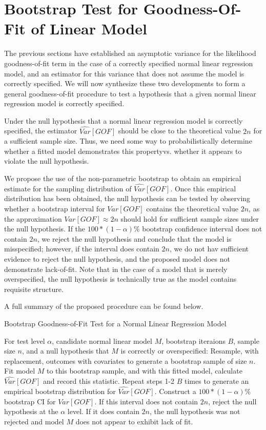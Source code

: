 		\section{Bootstrap Test for Goodness-Of-Fit of Linear Model} \label{sec:boot_test}

		The previous sections have established an asymptotic variance for the likelihood goodness-of-fit term in the case of a correctly specified normal linear regression model, and an
		estimator for this variance that does not assume the model is correctly specified. We will now synthesize these two developments to form a general goodness-of-fit procedure to
		test a hypothesis that a given normal linear regression model is correctly specified.

		Under the null hypothesis that a normal linear regression model is correctly specified, the estimator $\widehat{Var}[GOF]$ should be close to the theoretical value $2n$ for a
		sufficient sample size. Thus, we need some way to probabilistically determine whether a fitted model demonstrates this propertyvs. whether it appears to violate the null
		hypothesis.
		
		We propose the use of the non-parametric bootstrap to obtain an empirical estimate for the sampling distribution of $\widehat{Var}[GOF]$. Once this empirical distribution
		has been obtained, the null hypothesis can be tested by observing whether a bootstrap interval for $Var[GOF]$ contains the theoretical value $2n$, as the approximation
		$Var[GOF] \approx 2n$ should hold for sufficient sample sizes under the null hypothesis. If the $100*(1-\alpha)$\% bootstrap confidence interval does not contain 
		$2n$, we reject the null hypothesis and conclude that the model is misspecified; however, if the interval does contain $2n$, we do not hav sufficient evidence to reject
		the null hypothesis, and the proposed model does not demonstrate lack-of-fit. Note that in the case of a model that is merely overspecified, the null hypothesis is technically
		true as the model contains requisite structure.

		A full summary of the proposed procedure can be found below.
		\begin{algorithm}
			\caption{Bootstrap Goodness-of-Fit Test for a Normal Linear Regression Model}
			\begin{algorithmic}[1]
			  \Statex For test level $\alpha$, candidate normal linear model $M$, bootstrap iteraions $B$, sample size $n$, and a null hypothesis that $M$
			  is correctly or overspecified:
			  \State Resample, with replacement, outcomes with covariates to generate a bootstrap sample of size $n$.
			  \State Fit model $M$ to this bootstrap sample, and with this fitted model, calculate $\widehat{Var}[GOF]$
			  and record this statistic.
			  \State Repeat steps 1-2 $B$ times to generate an empirical bootstrap distribution for $\widehat{Var}[GOF]$.
			  \State Construct a $100*(1-\alpha)$\% bootstrap CI for $Var[GOF]$.
			  \State If this interval does not contain $2n$, reject the null hypothesis at the $\alpha$ level. If it does contain
			  $2n$, the null hypothesis was not rejected and model $M$ does not appear to exhibit lack of fit. 
			\end{algorithmic}
		\end{algorithm}

